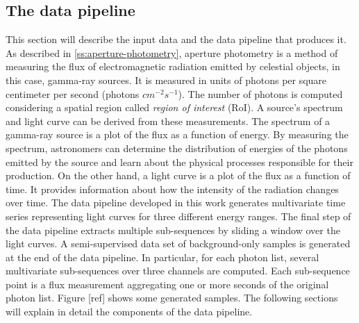 \subsection{The data pipeline}
\label{ss:data-pipeline}
This section will describe the input data and the data pipeline that produces it. As described in \autoref{ss:aperture-photometry}, aperture photometry is a method of measuring the flux of electromagnetic radiation emitted by celestial objects, in this case, gamma-ray sources. It is  measured in units of photons per square centimeter per second (photons $cm^{-2} s^{-1}$). The number of photons is computed considering a spatial region called \textit{region of interest} (RoI). A source's spectrum and light curve can be derived from these measurements. 
The spectrum of a gamma-ray source is a plot of the flux as a function of energy. By measuring the spectrum, astronomers can determine the distribution of energies of the photons emitted by the source and learn about the physical processes responsible for their production. On the other hand, a light curve is a plot of the flux as a function of time. It provides information about how the intensity of the radiation changes over time. The data pipeline developed in this work generates multivariate time series representing light curves for three different energy ranges. The final step of the data pipeline extracts multiple sub-sequences by sliding a window over the light curves. 
A semi-supervised data set of background-only samples is generated at the end of the data pipeline. In particular, for each photon list, several multivariate sub-sequences over three channels are computed. Each sub-sequence point is a flux measurement aggregating one or more seconds of the original photon list. Figure [ref] shows some generated samples. The following sections will explain in detail the components of the data pipeline.

